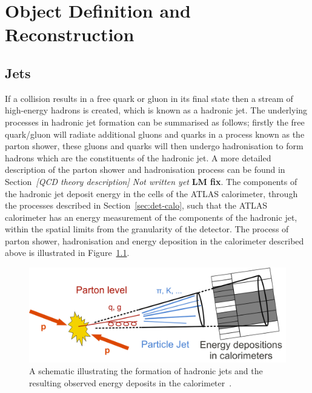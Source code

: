 \chapter{Object Definition and Reconstruction}
\label{sec:obj}

\section{Jets}
\label{sec:obj-jets}

If a collision results in a free quark or gluon in its final state then a stream of high-energy hadrons is created,
which is known as a hadronic jet.
The underlying processes in hadronic jet formation can be summarised as follows;
firstly the free quark/gluon will radiate additional gluons and quarks in a process known as the parton shower,
these gluons and quarks will then undergo hadronisation to form hadrons which are the constituents of the hadronic jet.
A more detailed description of the parton shower and hadronisation process can be found in Section~\textit{[QCD theory description] Not written yet} \textbf{LM fix}.
The components of the hadronic jet deposit energy in the cells of the ATLAS calorimeter, through the processes described in Section~\ref{sec:det-calo},
such that the ATLAS calorimeter has an energy measurement of the components of the hadronic jet, within the spatial limits from the granularity of the detector.
The process of parton shower, hadronisation and energy deposition in the calorimeter  described above is illustrated in Figure~\ref{fig:obj-jets_schem}.

\begin{figure}[!ht]
  \begin{center}
    \includegraphics[width=0.8\linewidth, angle=0]{figs/Objects/jets_schem.png}
  \end{center}
  \caption[A schematic illustrating the formation of hadronic jets and the resulting observed energy deposits in the calorimeter.]
          {A schematic illustrating the formation of hadronic jets and the resulting observed energy deposits in the calorimeter~\cite{obj-jets_schem}.}
  \label{fig:obj-jets_schem}
\end{figure}

